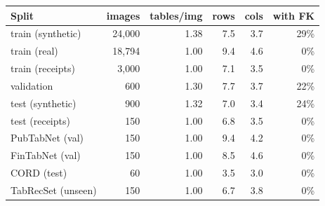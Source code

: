\begin{tabular}{lrrrrr}
\toprule
Split & images & tables/img & rows & cols & with FK \\
\midrule
train (synthetic) & 24,000 & 1.38 & 7.5 & 3.7 & 29\% \\
train (real) & 18,794 & 1.00 & 9.4 & 4.6 & 0\% \\
train (receipts) & 3,000 & 1.00 & 7.1 & 3.5 & 0\% \\
validation & 600 & 1.30 & 7.7 & 3.7 & 22\% \\
test (synthetic) & 900 & 1.32 & 7.0 & 3.4 & 24\% \\
test (receipts) & 150 & 1.00 & 6.8 & 3.5 & 0\% \\
PubTabNet (val) & 150 & 1.00 & 9.4 & 4.2 & 0\% \\
FinTabNet (val) & 150 & 1.00 & 8.5 & 4.6 & 0\% \\
CORD (test) & 60 & 1.00 & 3.5 & 3.0 & 0\% \\
TabRecSet (unseen) & 150 & 1.00 & 6.7 & 3.8 & 0\% \\
\bottomrule
\end{tabular}